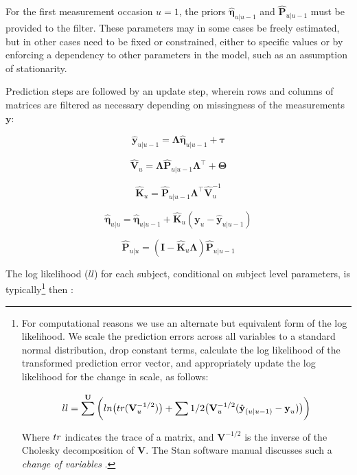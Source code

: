 \documentclass[nojss]{jss}\usepackage[]{graphicx}\usepackage[]{color}
\newcommand{\vect}[1]{\boldsymbol{\mathbf{#1}}}
\begin{document}
For the first measurement occasion $u = 1$, the priors $\hat{\vect{\eta}}_{u|u-1}$ and $\hat{\vect{P}}_{u|u-1}$ must be provided to the filter. These parameters may in some cases be freely estimated, but in other cases need to be fixed or constrained, either to specific values or by enforcing a dependency to other parameters in the model, such as an assumption of stationarity. 

Prediction steps are followed by an update step, wherein rows and columns of matrices are filtered as necessary depending on missingness of the measurements $\vect{y}$:

\begin{equation}
\hat{\vect{y}}_{u|u-1} =  \vect{\Lambda} \hat{\vect{\eta}}_{u|u-1} + \vect{\tau}
\end{equation}

\begin{equation}
\hat{\vect{V}}_{u} = \vect{\Lambda} \hat{\vect{P}}_{u|u-1} \vect{\Lambda}^\top + \vect{\Theta}
\end{equation}      

\begin{equation}
\hat{\vect{K}}_u = \hat{\vect{P}}_{u|u-1} \vect{\Lambda}^\top  \hat{\vect{V}}_{u}^{-1}
\end{equation}

\begin{equation}
\hat{\vect{\eta}}_{u|u} =  \hat{\vect{\eta}}_{u|u-1} + \hat{\vect{K}}_u ( \vect{y}_u -  \hat{\vect{y}}_{u|u-1}) 
\end{equation}

\begin{equation}
\hat{\vect{P}}_{u|u}  = (\vect{I} - \hat{\vect{K}}_u \vect{\Lambda}) \hat{\vect{P}}_{u|u-1} 
\end{equation}

The log likelihood ($ll$) for each subject, conditional on subject level parameters, is typically\footnote{For computational reasons we use an alternate but equivalent form of the log likelihood. We scale the prediction errors across all variables to a standard normal distribution, drop constant terms, calculate the log likelihood of the transformed prediction error vector, and appropriately update the log likelihood for the change in scale, as follows: 

\begin{equation}
ll = \sum^{\vect{U}} \bigg(  \mathnormal{ln}\big(\mathnormal{tr}(\vect{V}^{-1/2}_{u})\big) + \sum{ 1/2 \big(\vect{V}^{-1/2}_{u} ( \hat{\vect{y}}_{(u|u-1)} - \vect{y}_u ) \big)} \bigg)
\end{equation}

Where $\mathnormal{tr}$ indicates the trace of a matrix, and $\vect{V}^{-1/2}$ is the inverse of the Cholesky decomposition of $\vect{V}$. The Stan software manual discusses such a \textit{change of variables} \citep{standevelopmentteam2016stan}.} then \citep{genz2009computation}:
\end{document}
